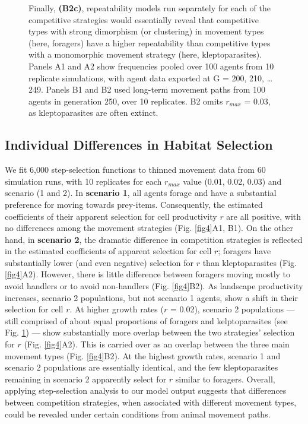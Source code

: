 \begin{figure}[h!]
{        Finally, \textbf{(B2c)}, repeatability models run separately for each of the competitive strategies would essentially reveal that competitive types with strong dimorphism (or clustering) in movement types (here, foragers) have a higher repeatability than competitive types with a monomorphic movement strategy (here, kleptoparasites).
        Panels A1 and A2 show frequencies pooled over 100 agents from 10 replicate simulations, with agent data exported at G = 200, 210, \ldots 249.
        Panels B1 and B2 used long-term movement paths from 100 agents in generation 250, over 10 replicates. B2 omits $r_{max}$ = 0.03, as kleptoparasites are often extinct.
    }
    \label{fig3}
\end{figure}

\subsection*{Individual Differences in Habitat Selection}

We fit 6,000 step-selection functions to thinned movement data from 60 simulation runs, with 10 replicates for each $r_{max}$ value (0.01, 0.02, 0.03) and scenario (1 and 2).
In \textbf{scenario 1}, all agents forage and have a substantial preference for moving towards prey-items.
Consequently, the estimated coefficients of their apparent selection for cell productivity $r$ are all positive, with no differences among the movement strategies (Fig. \ref{fig4}A1, B1).
On the other hand, in \textbf{scenario 2}, the dramatic difference in competition strategies is reflected in the estimated coefficients of apparent selection for cell $r$; foragers have substantially lower (and even negative) selection for $r$ than kleptoparasites (Fig. \ref{fig4}A2).
However, there is little difference between foragers moving mostly to avoid handlers or to avoid non-handlers (Fig. \ref{fig4}B2).
As landscape productivity increases, scenario 2 populations, but not scenario 1 agents, show a shift in their selection for cell $r$.
At higher growth rates ($r$ = 0.02), scenario 2 populations --- still comprised of about equal proportions of foragers and kelptoparasites (see Fig. \ref{fig3}) --- show substantially more overlap between the two strategies' selection for $r$ (Fig. \ref{fig4}A2).
This is carried over as an overlap between the three main movement types (Fig. \ref{fig4}B2).
At the highest growth rates, scenario 1 and scenario 2 populations are essentially identical, and the few kleptoparasites remaining in scenario 2 apparently select for $r$ similar to foragers.
Overall, applying step-selection analysis to our model output suggests that differences between competition strategies, when associated with different movement types, could be revealed under certain conditions from animal movement paths.

